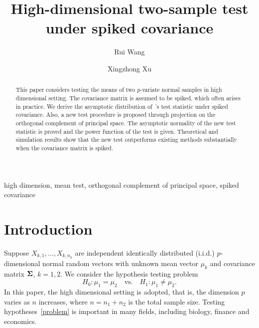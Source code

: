 \documentclass[review]{elsarticle}
\theoremstyle{plain}
\theoremstyle{definition}
\theoremstyle{remark}
\begin{document}
\begin{frontmatter}

\title{High-dimensional two-sample test under spiked covariance}

    \author[mymainaddress]{Rui Wang}
    \author[mymainaddress,mysecondaryaddress]{Xingzhong Xu}
    \address[mymainaddress]{School of Mathematics and Statistics, Beijing Institute of Technology, Beijing 
    100081,China}
    \address[mysecondaryaddress]{Beijing Key Laboratory on MCAACI, Beijing Institute of Technology, Beijing 100081,China}




\begin{abstract}
    This paper considers testing the means of two $p$-variate normal samples in high dimensional setting.
    The covariance matrix is assumed to be spiked, which often arises in practice. 
    We derive the asymptotic distribution of~\cite{Chen2010A}'s test statistic under spiked covariance.
    Also, a new test procedure is proposed through projection on the orthogonal complement of principal space.
    The asymptotic normality of the new test statistic is proved and the power function of the test is given.
    Theoretical and simulation results show that the new test outperforms existing methods substantially when the covariance matrix is spiked.
\end{abstract}

\begin{keyword}
    high dimension, mean test, orthogonal complement of principal space, spiked covariance
\end{keyword}

\end{frontmatter}




\section{Introduction}

Suppose $X_{k,1},\ldots,X_{k,n_k}$  are independent identically distributed (i.i.d.) $p$-dimensional normal random vectors with unknown mean vector $\mu_k$ and covariance matrix $\boldsymbol{\Sigma}$, $k=1,2$. We consider the hypothesis testing problem
\begin{equation}\label{problem}
    H_0:\mu_1=\mu_2\quad \textrm{vs.}\quad H_1:\mu_1\neq \mu_2.
\end{equation}
 In this paper, {the} high dimensional setting is adopted, that is, the dimension $p$ varies as $n$ increases, where $n=n_1+n_2$ is the total sample size.
Testing hypotheses~\eqref{problem} is important in many fields, including biology, finance and economics.
\end{document}
